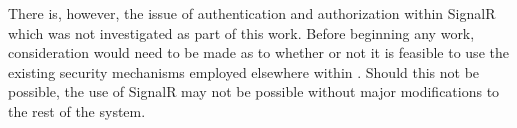 There is, however, the issue of authentication and authorization within SignalR which was not investigated as part of this work. Before beginning any work, consideration would need to be made as to whether or not it is feasible to use the existing security mechanisms employed elsewhere within . Should this not be possible, the use of SignalR may not be possible without major modifications to the rest of the system.
